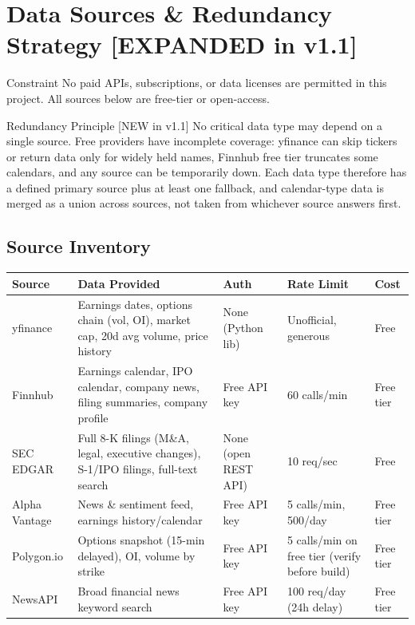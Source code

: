 \documentclass[11pt]{article}
\begin{document}
\section{Data Sources \& Redundancy Strategy \hfill {\small [EXPANDED in v1.1]}}\label{sec:sources}

\begin{callout}{Constraint}
No paid APIs, subscriptions, or data licenses are permitted in this project. All sources below are free-tier or open-access.
\end{callout}

\begin{warncallout}{Redundancy Principle [NEW in v1.1]}
No critical data type may depend on a single source. Free providers have incomplete coverage: yfinance can skip tickers or return data only for widely held names, Finnhub free tier truncates some calendars, and any source can be temporarily down. Each data type therefore has a defined primary source plus at least one fallback, and calendar-type data is merged as a union across sources, not taken from whichever source answers first.
\end{warncallout}

\subsection{Source Inventory}

\begin{tabularx}{\textwidth}{|L{2.1cm}|X|L{1.9cm}|L{2.9cm}|L{1.4cm}|}
\hline
\textbf{Source} & \textbf{Data Provided} & \textbf{Auth} & \textbf{Rate Limit} & \textbf{Cost} \\
\hline
yfinance & Earnings dates, options chain (vol, OI), market cap, 20d avg volume, price history & None (Python lib) & Unofficial, generous & Free \\
\hline
Finnhub & Earnings calendar, IPO calendar, company news, filing summaries, company profile & Free API key & 60 calls/min & Free tier \\
\hline
SEC EDGAR & Full 8-K filings (M\&A, legal, executive changes), S-1/IPO filings, full-text search & None (open REST API) & 10 req/sec & Free \\
\hline
Alpha Vantage & News \& sentiment feed, earnings history/calendar & Free API key & 5 calls/min, 500/day & Free tier \\
\hline
Polygon.io & Options snapshot (15-min delayed), OI, volume by strike & Free API key & 5 calls/min on free tier (verify before build) & Free tier \\
\hline
NewsAPI & Broad financial news keyword search & Free API key & 100 req/day (24h delay) & Free tier \\
\hline
\end{tabularx}
\end{document}
